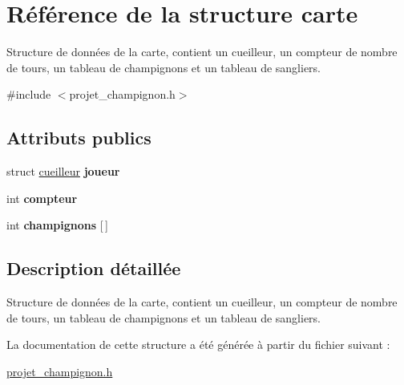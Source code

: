 \hypertarget{structcarte}{}\section{Référence de la structure carte}
\label{structcarte}


Structure de données de la carte, contient un cueilleur, un compteur de nombre de tours, un tableau de champignons et un tableau de sangliers.  




{\ttfamily \#include $<$projet\+\_\+champignon.\+h$>$}

\subsection*{Attributs publics}
\begin{DoxyCompactItemize}
\item 
\mbox{\label{structcarte_ac3e1886de48dd33100916e10bd12c3c8}} 
struct \hyperlink{structcueilleur}{cueilleur} {\bfseries joueur}
\item 
\mbox{\label{structcarte_a667883344ad4c184b3ca96f9879c2396}} 
int {\bfseries compteur}
\item 
\mbox{\label{structcarte_a7e9a4008bb4ec1cac7f6176997bbcd71}} 
int {\bfseries champignons} \mbox{[}$\,$\mbox{]}
\end{DoxyCompactItemize}


\subsection{Description détaillée}
Structure de données de la carte, contient un cueilleur, un compteur de nombre de tours, un tableau de champignons et un tableau de sangliers. 

La documentation de cette structure a été générée à partir du fichier suivant \+:\begin{DoxyCompactItemize}
\item 
\hyperlink{projet__champignon_8h}{projet\+\_\+champignon.\+h}\end{DoxyCompactItemize}
